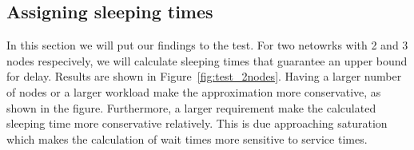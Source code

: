 \subsection{Assigning sleeping times}
In this section we will put our findings to the test. For two netowrks with 2 and 3 nodes respecively, we will calculate sleeping times that guarantee an upper bound for delay. Results are shown in Figure~\ref{fig:test_2nodes}. Having a larger number of nodes or a larger workload make the approximation more conservative, as shown in the figure. Furthermore, a larger requirement make the calculated sleeping time more conservative relatively. This is due approaching saturation which makes the calculation of wait times more sensitive to service times.



